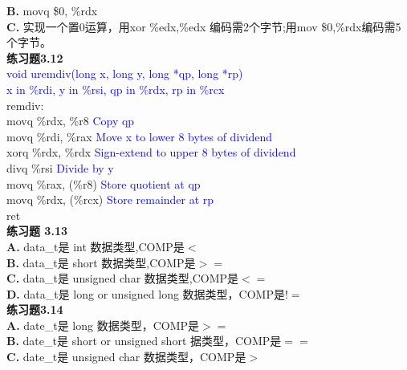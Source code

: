 \documentclass{article}
\newcommand{\blue}[1]{\textcolor{blue}{#1}}
\begin{document}
\begin{CJK}{UTF8}{uyhei}
\textbf{B.} movq \$0, \%rdx	\\
\textbf{C.} 实现一个置0运算，用xor \%edx,\%edx 编码需2个字节;用mov \$0,\%rdx编码需5个字节。	\\[3ex]
\textbf{练习题3.12}	\\[2ex]
\blue{void uremdiv(long x, long y, long *qp, long *rp)}	\\
\blue{x in \%rdi, y in \%rsi, qp in \%rdx, rp in \%rcx}	\\
remdiv:	\\
\hspace*{2em}	movq	\%rdx, \%r8	\hspace*{2em}\blue{Copy qp}	\\
\hspace*{2em}	movq	\%rdi, \%rax	\hspace*{1.7em}\blue{Move x to lower 8 bytes of dividend}	\\
\hspace*{2em}	xorq	\%rdx, \%rdx	\hspace*{1.8em}\blue{Sign-extend to upper 8 bytes of dividend}	\\
\hspace*{2em}	divq	\%rsi		\hspace*{5.2em}\blue{Divide by y}	\\
\hspace*{2em}	movq 	\%rax, (\%r8)	\hspace*{1.3em}\blue{Store quotient at qp}	\\
\hspace*{2em}	movq	\%rdx, (\%rcx)	\hspace*{0.8em}\blue{Store remainder at rp}	\\
\hspace*{2em}	ret	\\[3ex]
\textbf{练习题 3.13}	\\[2ex]
\textbf{A.} data\_t是 int 数据类型,COMP是$<$	\\
\textbf{B.} data\_t是 short 数据类型,COMP是$>=$	\\
\textbf{C.} data\_t是 unsigned char 数据类型,COMP是$<=$	\\
\textbf{D.} data\_t是 long or unsigned long 数据类型，COMP是$!=$	\\[3ex]
\textbf{练习题3.14}	\\[2ex]
\textbf{A.} date\_t是 long 数据类型，COMP是$>=$	\\
\textbf{B.} date\_t是 short or unsigned short 据类型，COMP是$==$	\\
\textbf{C.} date\_t是 unsigned char 数据类型，COMP是$>$	\\

\end{CJK}
\end{document}
